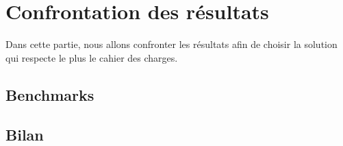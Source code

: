 \section{Confrontation des résultats}

Dans cette partie, nous allons confronter les résultats afin de choisir la solution qui respecte le plus le cahier des charges.



\subsection{Benchmarks}
\subsection{Bilan}

\pagebreak